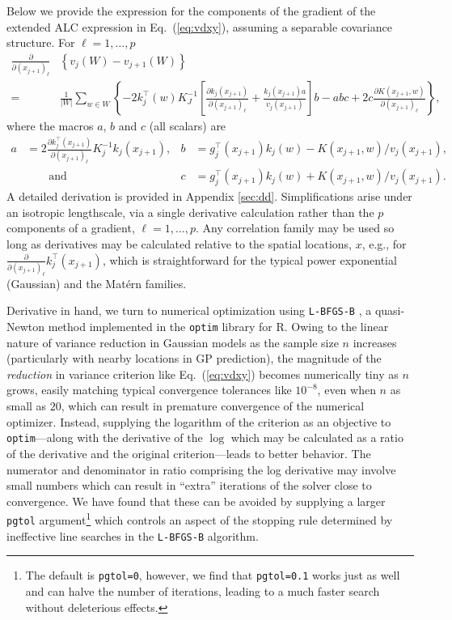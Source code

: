 \documentclass[12pt]{article}
\begin{document}
Below we provide the expression for the components of the gradient of
the extended ALC expression in Eq.~(\ref{eq:vdxy}), assuming a separable
covariance structure.  For $\ell=1, \dots, p$
\begin{align}
\frac{\partial}{\partial (x_{j+1})_\ell} &
\left\{v_j(W) - v_{j+1}(W)\right\} \label{eq:dalc} \\
=&\frac{1}{|W|}\sum_{w \in W} \left\{-2k^\top_j(w)K^{-1}_J\left[ 
\frac{\partial k_j (x_{j+1}) }{\partial (x_{j+1})_\ell}  + \frac{ k_j (x_{j+1}) a}{v_j(x_{j+1})} \right]b-abc + 
2 c \frac{\partial K(x_{j+1}, w)}{\partial (x_{j+1})_\ell}\right\}, \nonumber
\end{align}
where the macros $a$, $b$ and $c$ (all scalars) are
\begin{align*}
a &= 2 \frac{\partial k_j^\top (x_{j+1}) }{\partial (x_{j+1})_\ell}K_j^{-1} k_j (x_{j+1}), & 
b &=g_j^\top (x_{j+1})k_j(w) - K(x_{j+1},w)/v_j(x_{j+1}), \\
&\quad \quad \mbox{and}& c & =g_j^\top (x_{j+1})k_j(w) + K(x_{j+1},w)/v_j(x_{j+1}).  
\end{align*}
A detailed derivation is provided in Appendix \ref{sec:dd}. 
Simplifications arise under an isotropic lengthscale, via a single derivative
calculation rather than the $p$ components of a gradient, $\ell=1, \dots, p$.
Any correlation family may be used so long as derivatives may be calculated
relative to the spatial locations, $x$, e.g., for $
\frac{\partial}{\partial (x_{j+1})_\ell} k_j^\top (x_{j+1})$, which is straightforward
for the typical power exponential (Gaussian) and the Mat\'ern families.

Derivative in hand, we turn to numerical optimization using {\tt L-BFGS-B}
\citep{byrd:etal:1995}, a quasi-Newton method implemented in the {\tt optim}
library for {\sf R}. Owing to the linear nature of variance reduction in
Gaussian models as the sample size $n$ increases (particularly with nearby
locations in GP prediction), the magnitude of the {\em reduction} in variance
criterion like Eq.~(\ref{eq:vdxy}) becomes numerically tiny as $n$ grows, easily
matching typical convergence tolerances like $10^{-8}$, even when $n$ as small as
$20$, which can result in premature convergence of the numerical optimizer.
Instead, supplying the logarithm of the criterion as an objective to {\tt
optim}---along with the derivative of the $\log$ which may be calculated as a
ratio of the derivative and the original criterion---leads to better behavior.
The numerator and denominator in ratio comprising the log derivative may
involve small numbers which can result in ``extra'' iterations of the solver
close to convergence.  We have found that these can be avoided by supplying a larger
\verb!pgtol! argument\footnote{The default is {\tt pgtol=0}, however, we
find that {\tt pgtol=0.1} works just as well and can halve the number of
iterations, leading to a much faster search without deleterious effects.}
which controls an aspect of the stopping rule determined by ineffective line
searches in the \verb!L-BFGS-B! algorithm.
\end{document}
